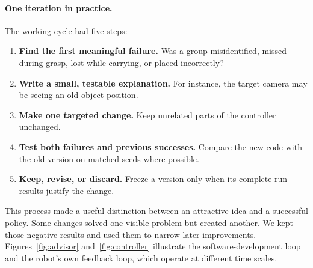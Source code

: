 \paragraph{One iteration in practice.}
The working cycle had five steps:
\begin{enumerate}[leftmargin=1.45em,itemsep=1pt,topsep=2pt]
\item \textbf{Find the first meaningful failure.} Was a group misidentified, missed during grasp, lost while carrying, or placed incorrectly?
\item \textbf{Write a small, testable explanation.} For instance, the target camera may be seeing an old object position.
\item \textbf{Make one targeted change.} Keep unrelated parts of the controller unchanged.
\item \textbf{Test both failures and previous successes.} Compare the new code with the old version on matched seeds where possible.
\item \textbf{Keep, revise, or discard.} Freeze a version only when its complete-run results justify the change.
\end{enumerate}

This process made a useful distinction between an attractive idea and a successful policy. Some changes solved one visible problem but created another. We kept those negative results and used them to narrow later improvements. Figures~\ref{fig:advisor} and~\ref{fig:controller} illustrate the software-development loop and the robot's own feedback loop, which operate at different time scales.
